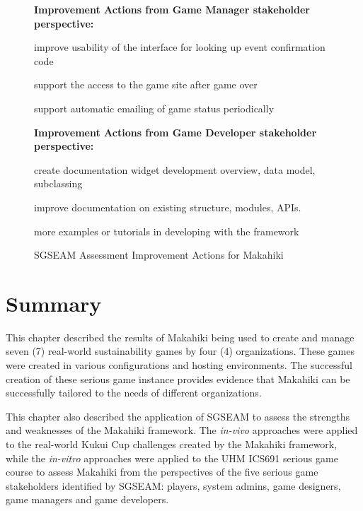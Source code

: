 \begin{figure}[ht!]
\begin{mybox}
\textbf{Improvement Actions from Game Manager stakeholder perspective:}
\begin{compactenum}
\item improve usability of the interface for looking up event confirmation code
\item support the access to the game site after game over
\item support automatic emailing of game status periodically
\end{compactenum}

\textbf{Improvement Actions from Game Developer stakeholder perspective:}
\begin{compactenum}
\item create documentation widget development overview, data model, subclassing
\item improve documentation on existing structure, modules, APIs.
\item more examples or tutorials in developing with the framework
\end{compactenum}

\end{mybox}
\caption{SGSEAM Assessment Improvement Actions for Makahiki}
\label{fig:assessment-action}  
\end{figure}

\section{Summary}

This chapter described the results of Makahiki being used to create and manage seven (7) real-world sustainability games by four (4) organizations. These games were created in various configurations and hosting environments. The successful creation of these serious game instance provides evidence that Makahiki can be successfully tailored to the needs of different organizations.

This chapter also described the application of SGSEAM to assess the strengths and weaknesses of the Makahiki framework. The {\em in-vivo} approaches were applied to the real-world Kukui Cup challenges created by the Makahiki framework, while the {\em in-vitro} approaches were applied to the UHM ICS691 serious game course to assess Makahiki from the perspectives of the five serious game stakeholders identified by SGSEAM: players, system admins, game designers, game managers and game developers.

